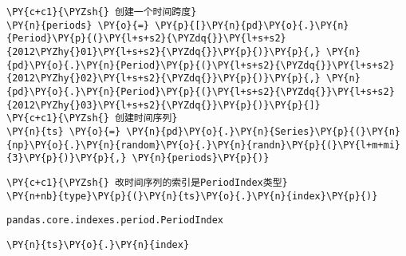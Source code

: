     \begin{tcolorbox}[breakable, size=fbox, boxrule=1pt, pad at break*=1mm,colback=cellbackground, colframe=cellborder]
\begin{Verbatim}[commandchars=\\\{\}]
\PY{c+c1}{\PYZsh{} 创建一个时间跨度}
\PY{n}{periods} \PY{o}{=} \PY{p}{[}\PY{n}{pd}\PY{o}{.}\PY{n}{Period}\PY{p}{(}\PY{l+s+s2}{\PYZdq{}}\PY{l+s+s2}{2012\PYZhy{}01}\PY{l+s+s2}{\PYZdq{}}\PY{p}{)}\PY{p}{,} \PY{n}{pd}\PY{o}{.}\PY{n}{Period}\PY{p}{(}\PY{l+s+s2}{\PYZdq{}}\PY{l+s+s2}{2012\PYZhy{}02}\PY{l+s+s2}{\PYZdq{}}\PY{p}{)}\PY{p}{,} \PY{n}{pd}\PY{o}{.}\PY{n}{Period}\PY{p}{(}\PY{l+s+s2}{\PYZdq{}}\PY{l+s+s2}{2012\PYZhy{}03}\PY{l+s+s2}{\PYZdq{}}\PY{p}{)}\PY{p}{]}
\PY{c+c1}{\PYZsh{} 创建时间序列}
\PY{n}{ts} \PY{o}{=} \PY{n}{pd}\PY{o}{.}\PY{n}{Series}\PY{p}{(}\PY{n}{np}\PY{o}{.}\PY{n}{random}\PY{o}{.}\PY{n}{randn}\PY{p}{(}\PY{l+m+mi}{3}\PY{p}{)}\PY{p}{,} \PY{n}{periods}\PY{p}{)}
\end{Verbatim}
\end{tcolorbox}

    \begin{tcolorbox}[breakable, size=fbox, boxrule=1pt, pad at break*=1mm,colback=cellbackground, colframe=cellborder]
\begin{Verbatim}[commandchars=\\\{\}]
\PY{c+c1}{\PYZsh{} 改时间序列的索引是PeriodIndex类型}
\PY{n+nb}{type}\PY{p}{(}\PY{n}{ts}\PY{o}{.}\PY{n}{index}\PY{p}{)}
\end{Verbatim}
\end{tcolorbox}

            \begin{tcolorbox}[breakable, size=fbox, boxrule=.5pt, pad at break*=1mm, opacityfill=0]
\begin{Verbatim}[commandchars=\\\{\}]
pandas.core.indexes.period.PeriodIndex
\end{Verbatim}
\end{tcolorbox}
        
    \begin{tcolorbox}[breakable, size=fbox, boxrule=1pt, pad at break*=1mm,colback=cellbackground, colframe=cellborder]
\begin{Verbatim}[commandchars=\\\{\}]
\PY{n}{ts}\PY{o}{.}\PY{n}{index}
\end{Verbatim}
\end{tcolorbox}

